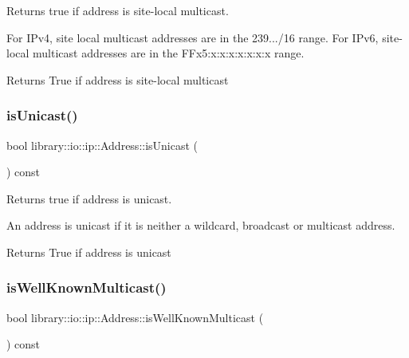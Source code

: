 Returns true if address is site-\/local multicast. 

For I\+Pv4, site local multicast addresses are in the 239.../16 range. For I\+Pv6, site-\/local multicast addresses are in the F\+Fx5\+:x\+:x\+:x\+:x\+:x\+:x\+:x range.

\begin{DoxyReturn}{Returns}
True if address is site-\/local multicast 
\end{DoxyReturn}
\mbox{\label{classlibrary_1_1io_1_1ip_1_1_address_af01a1e2adfd5233077ca1031ed289806}} 
\subsubsection{\texorpdfstring{is\+Unicast()}{isUnicast()}}
{\footnotesize\ttfamily bool library\+::io\+::ip\+::\+Address\+::is\+Unicast (\begin{DoxyParamCaption}{ }\end{DoxyParamCaption}) const}



Returns true if address is unicast. 

An address is unicast if it is neither a wildcard, broadcast or multicast address.

\begin{DoxyReturn}{Returns}
True if address is unicast 
\end{DoxyReturn}
\mbox{\label{classlibrary_1_1io_1_1ip_1_1_address_a4720a52b340f77fcecab4963a6e773b5}} 
\subsubsection{\texorpdfstring{is\+Well\+Known\+Multicast()}{isWellKnownMulticast()}}
{\footnotesize\ttfamily bool library\+::io\+::ip\+::\+Address\+::is\+Well\+Known\+Multicast (\begin{DoxyParamCaption}{ }\end{DoxyParamCaption}) const}



